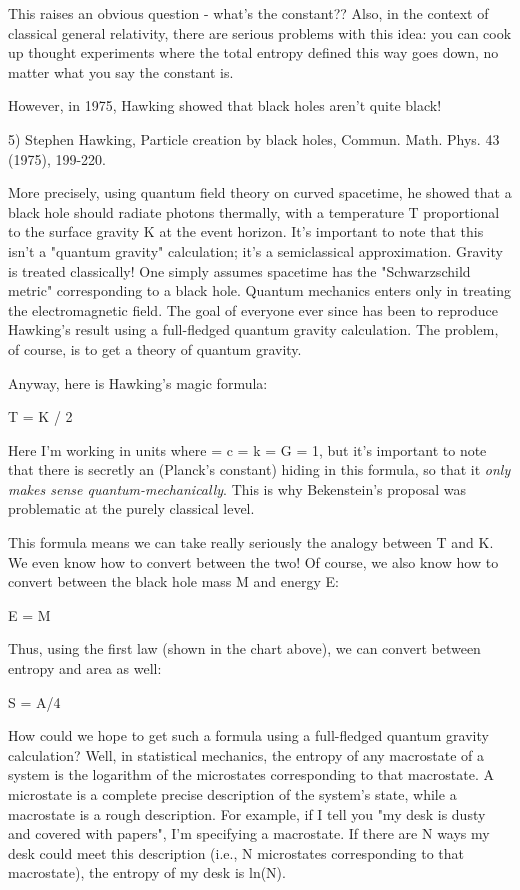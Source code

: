 This raises an obvious question - what's the constant??  Also,
in the context of classical general relativity, there are serious
problems with this idea: you can cook up thought experiments where the
total entropy defined this way goes down, no matter what you say the
constant is.  

However, in 1975, Hawking showed that black holes aren't quite black!

5) Stephen Hawking, Particle creation by black holes, Commun. 
Math. Phys. 43 (1975), 199-220.

More precisely, using quantum field theory on curved spacetime, he
showed that a black hole should radiate photons thermally, with a
temperature T proportional to the surface gravity K at the event
horizon.  It's important to note that this isn't a "quantum gravity"
calculation; it's a semiclassical approximation.  Gravity is treated
classically!  One simply assumes spacetime has the "Schwarzschild
metric" corresponding to a black hole.  Quantum mechanics enters only in
treating the electromagnetic field.  The goal of everyone ever since has
been to reproduce Hawking's result using a full-fledged quantum gravity
calculation.  The problem, of course, is to get a theory of quantum
gravity.

Anyway, here is Hawking's magic formula:

                        T = K / 2 \pi 

Here I'm working in units where \hbar  = c = k = G = 1, but it's important
to note that there is secretly an \hbar  (Planck's constant) hiding in
this formula, so that it \emph{only makes sense quantum-mechanically}.  This
is why Bekenstein's proposal was problematic at the purely classical
level.  

This formula means we can take really seriously the analogy between T
and K.  We even know how to convert between the two!  Of course, we also
know how to convert between the black hole mass M and energy E:

                           E = M 

Thus, using the first law (shown in the chart above), we can convert
between entropy and area as well:

                          S = A/4

How could we hope to get such a formula using a full-fledged quantum
gravity calculation?  Well, in statistical mechanics, the entropy of any
macrostate of a system is the logarithm of the microstates corresponding
to that macrostate.  A microstate is a complete precise description of
the system's state, while a macrostate is a rough description.  For
example, if I tell you "my desk is dusty and covered with papers", I'm
specifying a macrostate.  If there are N ways my desk could meet this
description (i.e., N microstates corresponding to that macrostate), the
entropy of my desk is ln(N).

